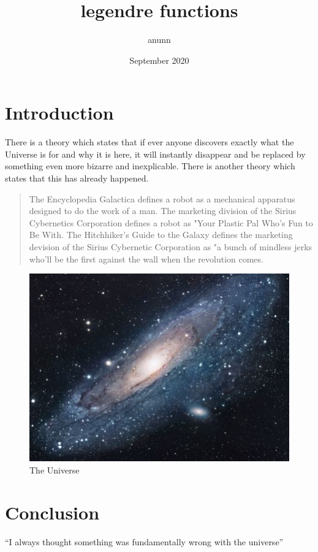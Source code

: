 \documentclass{article}
\title{legendre functions}
\author{anunn }
\date{September 2020}
\begin{document}
\maketitle

\section{Introduction}
There is a theory which states that if ever anyone discovers exactly what the Universe is for and why it is here, it will instantly disappear and be replaced by something even more bizarre and inexplicable.
There is another theory which states that this has already happened.

\begin{quote}
The Encyclopedia Galactica defines a robot as a mechanical apparatus designed to do the work of a man. The marketing division of the Sirius Cybernetics Corporation defines a robot as "Your Plastic Pal Who's Fun to Be With. The Hitchhiker's Guide to the Galaxy defines the marketing devision of the Sirius Cybernetic Corporation as "a bunch of mindless jerks who'll be the first against the wall when the revolution comes.
\end{quote}

\begin{figure}[h!]
\centering
\includegraphics[scale=1.7]{universe}
\caption{The Universe}
\label{fig:universe}
\end{figure}

\section{Conclusion}
``I always thought something was fundamentally wrong with the universe'' \citep{adams1995hitchhiker}



\end{document}
